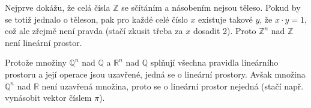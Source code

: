 \documentclass{fkssolpub}
\newcommand{\R}{\mathbb{R}}
\newcommand{\Q}{\mathbb{Q}}
\begin{document}
Nejprve dokážu, že celá čísla $\mathbb{Z}$ se sčítáním a násobením nejsou těleso. Pokud by se totiž jednalo o těleson, pak pro každé celé číslo $x$ existuje takové $y$, že $x \cdot y = 1$, což ale zřejmě není pravda (stačí zkusit třeba za $x$ dosadit 2). Proto $\mathbb{Z}^n$ nad $\mathbb{Z}$ není lineární prostor.

Protože množiny $\Q^n$ nad $\Q$ a $\R^n$ nad $\Q$ splňují všechna pravidla lineárního prostoru a její operace jsou uzavřené, jedná se o lineární prostory. Avšak množina $\Q^n$ nad $\R$ není uzavřená množina, proto se o lineární prostor nejedná (stačí např. vynásobit vektor číslem $\pi$).
\end{document}
